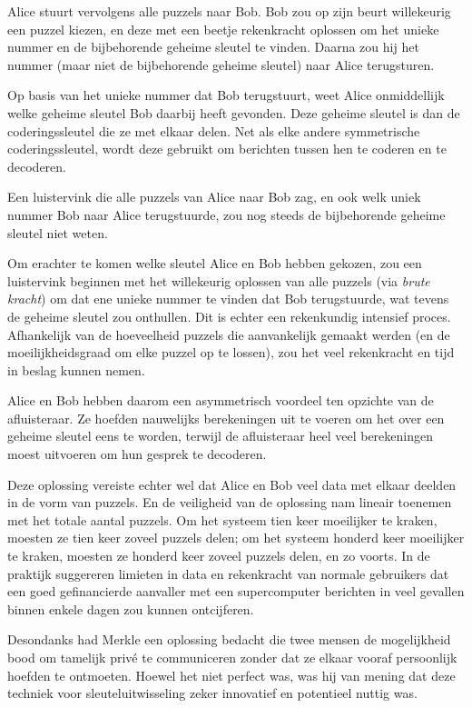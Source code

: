 \documentclass[
  a5paper,
  smalldemyvopaper,11pt,twoside,onecolumn,openright,extrafontsizes,
hidelinks]{memoir}
\begin{document}
Alice stuurt vervolgens alle puzzels naar Bob. Bob zou op zijn beurt
willekeurig een puzzel kiezen, en deze met een beetje rekenkracht
oplossen om het unieke nummer en de bijbehorende geheime sleutel te
vinden. Daarna zou hij het nummer (maar niet de bijbehorende geheime
sleutel) naar Alice terugsturen.

Op basis van het unieke nummer dat Bob terugstuurt, weet Alice
onmiddellijk welke geheime sleutel Bob daarbij heeft gevonden. Deze
geheime sleutel is dan de coderingssleutel die ze met elkaar delen. Net
als elke andere symmetrische coderingssleutel, wordt deze gebruikt om
berichten tussen hen te coderen en te decoderen.

Een luistervink die alle puzzels van Alice naar Bob zag, en ook welk
uniek nummer Bob naar Alice terugstuurde, zou nog steeds de bijbehorende
geheime sleutel niet weten.

Om erachter te komen welke sleutel Alice en Bob hebben gekozen, zou een
luistervink beginnen met het willekeurig oplossen van alle puzzels (via
\emph{brute kracht}) om dat ene unieke nummer te vinden dat Bob
terugstuurde, wat tevens de geheime sleutel zou onthullen. Dit is echter
een rekenkundig intensief proces. Afhankelijk van de hoeveelheid puzzels
die aanvankelijk gemaakt werden (en de moeilijkheidsgraad om elke puzzel
op te lossen), zou het veel rekenkracht en tijd in beslag kunnen nemen.

Alice en Bob hebben daarom een asymmetrisch voordeel ten opzichte van de
afluisteraar. Ze hoefden nauwelijks berekeningen uit te voeren om het
over een geheime sleutel eens te worden, terwijl de afluisteraar heel
veel berekeningen moest uitvoeren om hun gesprek te decoderen.

Deze oplossing vereiste echter wel dat Alice en Bob veel data met elkaar
deelden in de vorm van puzzels. En de veiligheid van de oplossing nam
lineair toenemen met het totale aantal puzzels. Om het systeem tien keer
moeilijker te kraken, moesten ze tien keer zoveel puzzels delen; om het
systeem honderd keer moeilijker te kraken, moesten ze honderd keer
zoveel puzzels delen, en zo voorts. In de praktijk suggereren limieten
in data en rekenkracht van normale gebruikers dat een goed gefinancierde
aanvaller met een supercomputer berichten in veel gevallen binnen enkele
dagen zou kunnen ontcijferen.

Desondanks had Merkle een oplossing bedacht die twee mensen de
mogelijkheid bood om tamelijk privé te communiceren zonder dat ze elkaar
vooraf persoonlijk hoefden te ontmoeten. Hoewel het niet perfect was,
was hij van mening dat deze techniek voor sleuteluitwisseling zeker
innovatief en potentieel nuttig was.
\end{document}
